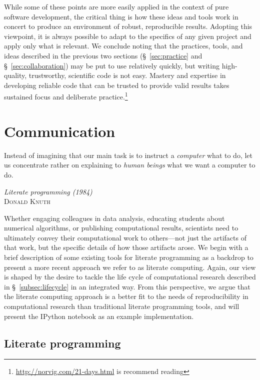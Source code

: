 \documentclass[11pt,oneside,english]{article}
\begin{document}
While some of these points are more easily applied in the context of pure
software development, the critical thing is how these ideas and tools work in
concert to produce an environment of robust, reproducible results.  Adopting
this viewpoint, it is always possible to adapt to the specifics of any given
project and apply only what is relevant. We conclude noting that the practices,
tools, and ideas described in the previous two sections (§~\ref{sec:practice}
and §~\ref{sec:collaboration}) may be put to use relatively quickly, but
writing high-quality, trustworthy, scientific code is not easy. Mastery and
expertise in developing reliable code that can be trusted to provide valid
results takes sustained focus and deliberate
practice.\footnote{\url{http://norvig.com/21-days.html} is recommend reading}

\section{\label{sec:communication}Communication}

\setlength{\epigraphrule}{0pt}
\setlength{\epigraphwidth}{.90\textwidth}
\epigraph%
{%
Instead of imagining that our main task is to instruct a \emph{computer}
what to do, let us concentrate rather on explaining to \emph{human beings}
what we want a computer to do.
}%
{\textit{Literate programming (1984)}\\ \textsc{Donald Knuth} }

Whether engaging colleagues in data analysis, educating students about
numerical algorithms, or publishing computational results, scientists need to
ultimately convey their computational work to others---not just the artifacts
of that work, but the specific details of how those artifacts arose.  We begin
with a brief description of some existing tools for literate programming as a
backdrop to present a more recent approach we refer to as literate computing.
Again, our view is shaped by the desire to tackle the life cycle of
computational research described in §~\ref{subsec:lifecycle} in an integrated way.
From this perspective, we argue that the literate computing approach is a
better fit to the needs of reproducibility in computational research than
traditional literate programming tools, and will present the IPython notebook
as an example implementation.

\subsection{Literate programming}
\end{document}
